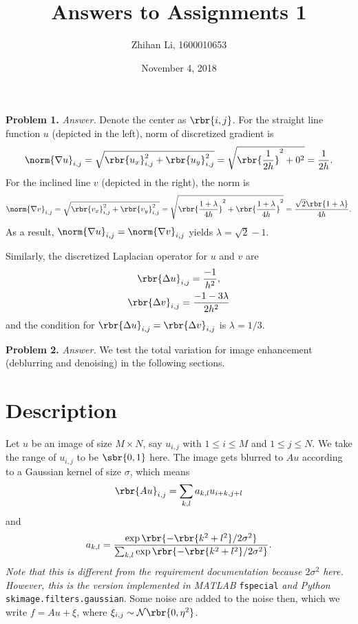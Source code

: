 \documentclass[english, nochinese]{pnote}
\title{Answers to Assignments 1}
\author{Zhihan Li, 1600010653}
\date{November 4, 2018}
\begin{document}
\maketitle

\textbf{Problem 1.} \textit{Answer.} Denote the center as $ \rbr{ i, j } $. For the straight line function $u$ (depicted in the left), norm of discretized gradient is
\begin{equation}
\norm{ \nabla u }_{ i, j } = \sqrt{ \rbr{u_x}_{ i, j }^2 + \rbr{u_y}_{ i, j } ^2 } = \sqrt{ \rbr{\frac{1}{ 2 h }}^2 + 0^2 } = \frac{1}{ 2 h }.
\end{equation}
For the inclined line $v$ (depicted in the right), the norm is
\begin{equation}
\norm{ \nabla v }_{ i, j } = \sqrt{ \rbr{v_x}_{ i, j }^2 + \rbr{v_y}_{ i, j } ^2 } = \sqrt{ \rbr{\frac{ 1 + \lambda }{ 4 h }}^2 + \rbr{\frac{ 1 + \lambda }{ 4 h }}^2 } = \frac{ \sqrt{2} \rbr{ 1 + \lambda } }{ 4 h }.
\end{equation}
As a result, $ \norm{ \nabla u }_{ i, j } = \norm{ \nabla v }_{ i, j } $ yields $ \lambda = \sqrt{2} - 1 $.

Similarly, the discretized Laplacian operator for $u$ and $v$ are
\begin{gather}
\rbr{ \Delta u }_{ i, j } = \frac{-1}{h^2}, \\
\rbr{ \Delta v }_{ i, j } = \frac{ -1 - 3 \lambda }{ 2 h^2 }
\end{gather}
and the condition for $ \rbr{ \Delta u }_{ i, j } = \rbr{ \Delta v }_{ i, j } $ is $ \lambda = 1 / 3 $.

\textbf{Problem 2.} \textit{Answer.} We test the total variation for image enhancement (deblurring and denoising) in the following sections.

\section{Description}

Let $u$ be an image of size $ M \times N $, say $ u_{ i, j } $ with $ 1 \le i \le M $ and $ 1 \le j \le N $. We take the range of $ u_{ i, j } $ to be $ \sbr{ 0, 1 } $ here. The image gets blurred to $ A u $ according to a Gaussian kernel of size $\sigma$, which means
\begin{equation}
\rbr{ A u }_{ i, j } = \sum_{ k, l } a_{ k, l } u_{ i + k, j + l }
\end{equation}
and
\begin{equation}
a_{ k, l } = \frac{ \exp \rbr{ -\rbr{ k^2 + l^2 } / 2 \sigma^2 } }{ \sum_{ k, l } \exp \rbr{ -\rbr{ k^2 + l^2 } / 2 \sigma^2 } }.
\end{equation}
\emph{Note that this is different from the requirement documentation because $ 2 \sigma^2 $ here. However, this is the version implemented in MATLAB} \verb"fspecial" \emph{and Python} \verb"skimage.filters.gaussian". Some noise are added to the noise then, which we write $ f = A u + \xi $, where $ \xi_{ i, j } \sim \mathcal{N} \rbr{ 0, \eta^2 } $.
\end{document}
